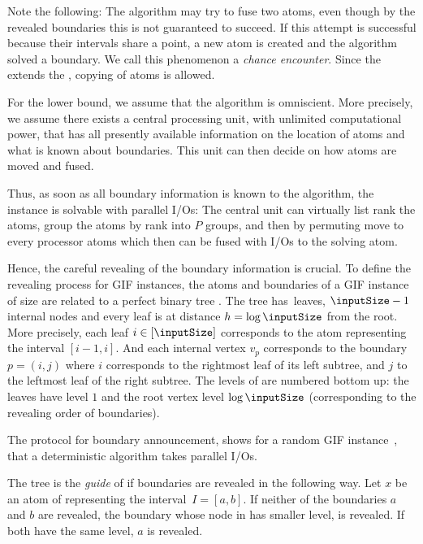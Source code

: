 \documentclass[envcountsame]{llncs}
\def\bO#1{\printmath{\mathcal{O}\left(#1\right)}}
\def\bOm#1{\printmath{\Omega \left(#1\right)}}
\begin{document}
Note the following: 
The algorithm may try to fuse two atoms, even though by the revealed boundaries this is not guaranteed to succeed.
If this attempt is successful because their intervals share a point, a new atom is created and the algorithm solved a boundary.
We call this phenomenon a \emph{chance encounter}.
Since the \fusePEM extends the \movePEM, copying of atoms is allowed.


For the lower bound, we assume that the algorithm is omniscient. More precisely, we assume there exists a central processing unit, with unlimited computational power, that has all presently available information on the location of atoms and what is known about boundaries. 
This unit can then decide on how atoms are moved and fused. 

Thus, as soon as all boundary information is known to the algorithm, the instance is solvable with \bO{\log \inputSize} parallel I/Os:
The central unit can virtually list rank the atoms, group the atoms by rank into $P$ groups, and then by permuting move to every processor \bO{\memorySize} atoms which then can be fused with \bO{1} I/Os to the solving atom.



Hence, the careful revealing of the boundary information is crucial. 
To define the revealing process for GIF instances, the atoms and boundaries of a GIF instance \gifInstance of size  are related to a perfect binary tree \binaryTreeOf{\gifInstance}.
The tree \binaryTreeOf{\gifInstance} has~ leaves, $\inputSize -1$ internal nodes and every leaf is at distance $h=\log \inputSize$ from the root. 
More precisely, each leaf $i\in[\inputSize]$ corresponds to the atom representing the interval $[i-1,i]$.
And each internal vertex $v_p$ corresponds to the boundary~\mbox{$p=(i,j)$} where $i$ corresponds to the rightmost leaf of its left subtree, and $j$ to the leftmost leaf of the right subtree.
The levels of \binaryTreeOf{\gifInstance} are numbered bottom up: the leaves have level $1$ and the root vertex level $\log\inputSize$ (corresponding to the revealing order of boundaries).


The protocol for boundary announcement, shows for a random GIF instance~\gifInstance, that a deterministic algorithm takes \bOm{\log^2\inputSize} parallel I/Os.

\begin{definition}
\label{definitionAnnouncingGuide}
	The tree \binaryTreeOf{\gifInstance} is the \emph{guide} of \gifInstance if boundaries are revealed in the following way.
        Let $x$ be an atom of \gifInstance representing the interval~$I=[a,b]$.
        If neither of the boundaries  $a$ and $b$ are revealed, the boundary whose node in \binaryTreeOf{\gifInstance} has smaller level, is revealed. 
        If both have the same level, $a$ is revealed. 
\end{definition}
\end{document}
